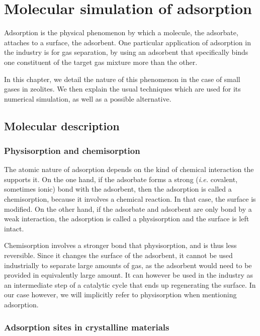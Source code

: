 \documentclass[main.tex]{subfiles}
\begin{document}
\chapter{Molecular simulation of adsorption}
\vspace*{-1\baselineskip}
\label{adsorption}

Adsorption is the physical phenomenon by which a molecule, the adsorbate, attaches to a surface, the adsorbent. One particular application of adsorption in the industry is for gas separation, by using an adsorbent that specifically binds one constituent of the target gas mixture more than the other.

In this chapter, we detail the nature of this phenomenon in the case of small gases in zeolites. We then explain the usual techniques which are used for its numerical simulation, as well as a possible alternative.

\section{Molecular description}

\subsection{Physisorption and chemisorption}

The atomic nature of adsorption depends on the kind of chemical interaction the supports it. On the one hand, if the adsorbate forms a strong (\textit{i.e.} covalent, sometimes ionic) bond with the adsorbent, then the adsorption is called a chemisorption, because it involves a chemical reaction. In that case, the surface is modified. On the other hand, if the adsorbate and adsorbent are only bond by a weak interaction, the adsorption is called a physisorption and the surface is left intact.

Chemisorption involves a stronger bond that physisorption, and is thus less reversible. Since it changes the surface of the adsorbent, it cannot be used industrially to separate large amounts of gas, as the adsorbent would need to be provided in equivalently large amount. It can however be used in the industry as an intermediate step of a catalytic cycle that ends up regenerating the surface. In our case however, we will implicitly refer to physisorption when mentioning adsorption.

\subsection{Adsorption sites in crystalline materials}
\end{document}
